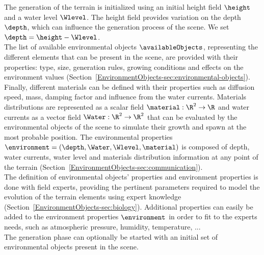 The generation of the terrain is initialized using an initial height field $\height$ and a water level $\Wlevel$. The height field provides variation on the depth $\depth$, which can influence the generation process of the scene. We set $\depth = \height - \Wlevel$. \\
The list of available environmental objects $\availableObjects$, representing the different elements that can be present in the scene, are provided with their properties: type, size, generation rules, growing conditions and effects on the environment values (Section~\ref{EnvironmentObjects-sec:environmental-objects}). \\
Finally, different materials can be defined with their properties such as diffusion speed, mass, damping factor and influence from the water currents. Materials distributions are represented as a scalar field $\material: \R^2 \to \R$ and water currents as a vector field $\Water: \R^2 \to \R^2$ that can be evaluated by the environmental objects of the scene to simulate their growth and spawn at the most probable position. The environmental properties $\environment = (\depth, \Water, \Wlevel, \material)$ is composed of depth, water currents, water level and materials distribution information at any point of the terrain (Section~\ref{EnvironmentObjects-sec:communication}). \\
The definition of environmental objects' properties and environment properties is done with field experts, providing the pertinent parameters required to model the evolution of the terrain elements using expert knowledge (Section~\ref{EnvironmentObjects-sec:biology}). Additional properties can easily be added to the environment properties $\environment$ in order to fit to the experts needs, such as atmospheric pressure, humidity, temperature, ... \\
The generation phase can optionally be started with an initial set of environmental objects present in the scene. 

